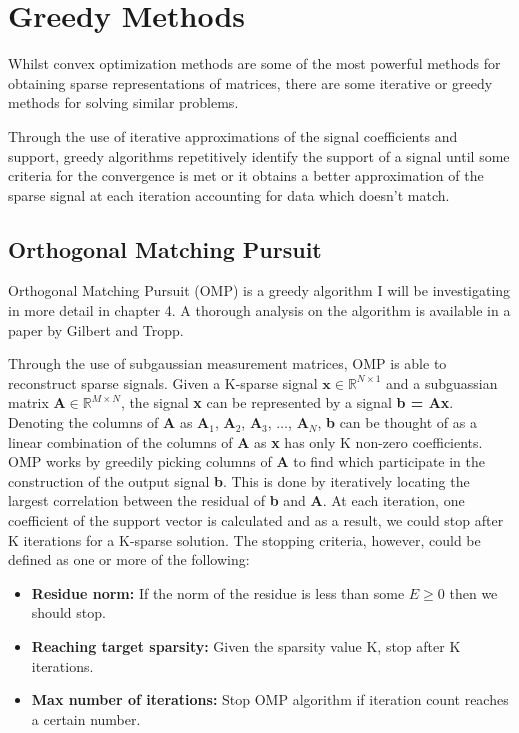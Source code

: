 \documentclass[titlepage,oneside, 12pt]{book}
\theoremstyle{break}
\begin{document}
\section{Greedy Methods}
Whilst convex optimization methods are some of the most powerful methods for obtaining sparse representations of matrices, there are some iterative or greedy methods for solving similar problems.

Through the use of iterative approximations of the signal coefficients and support, greedy algorithms repetitively identify the support of a signal until some criteria for the convergence is met or it obtains a better approximation of the sparse signal at each iteration accounting for data which doesn't match. 
\newpage
\subsection{Orthogonal Matching Pursuit}\label{OMP}
Orthogonal Matching Pursuit (OMP) is a greedy algorithm I will be investigating in more detail in chapter 4. A thorough analysis on the algorithm is available in a paper by Gilbert and Tropp\cite{GP}. 

Through the use of subgaussian measurement matrices, OMP is able to reconstruct sparse signals. Given a K-sparse signal $\textbf{x} \in \mathbb{R}^{N \times 1}$ and a subguassian matrix $\textbf{A} \in \mathbb{R}^{M \times N}$, the signal \textbf{x} can be represented by a signal \textbf{b = Ax}. Denoting the columns of \textbf{A} as $\textbf{A}_1$, $\textbf{A}_2$, $\textbf{A}_3$, $\ldots$, $\textbf{A}_N$, \textbf{b} can be thought of as a linear combination of the columns of \textbf{A} as \textbf{x} has only K non-zero coefficients. OMP works by greedily picking columns of \textbf{A} to find which participate in the construction of the output signal \textbf{b}. This is done by iteratively locating the largest correlation between the residual of \textbf{b} and \textbf{A}. At each iteration, one coefficient of the support vector is calculated and as a result, we could stop after K iterations for a K-sparse solution. The stopping criteria, however, could be defined as one or more of the following:

\begin{itemize}
\item \textbf{Residue norm:} If the norm of the residue is less than some $E \geq 0$ then we should stop. 
\item \textbf{Reaching target sparsity:} Given the sparsity value K, stop after K iterations. 
\item \textbf{Max number of iterations:} Stop OMP algorithm if iteration count reaches a certain number. 
\end{itemize} 
\end{document}
